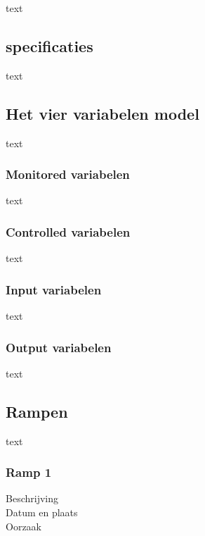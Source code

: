 \documentclass{article}
\begin{document}
		text
		
		\subsection{specificaties}
		
		text
		
		\subsection{Het vier variabelen model}
		
		text
		
			\subsubsection{Monitored variabelen}
			
			text
			
			\subsubsection{Controlled variabelen}
			
			text
			
			\subsubsection{Input variabelen}
			
			text
			
			\subsubsection{Output variabelen}
			
			text
		
		\subsection{Rampen}
		
		text
		
			\subsubsection{Ramp 1}
			\begin{description}
			\item[Beschrijving]
			\item[Datum en plaats] 
			\item[Oorzaak]
			\end{description}
			
\end{document}
